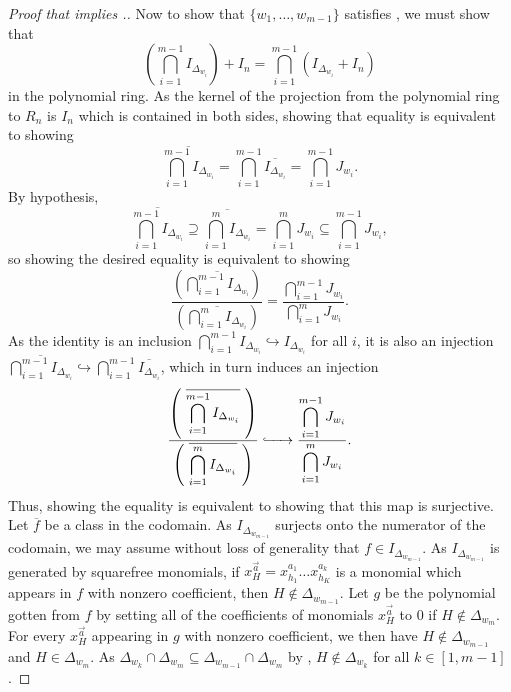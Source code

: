 \begin{proof}[Proof that  implies .]
    Now to show that $\{w_1,\dots,w_{m-1}\}$ satisfies , we must show that 
    \[
    \left(\bigcap_{i=1}^{m-1} I_{\Delta_{w_i}}\right)+I_n=\bigcap_{i=1}^{m-1} \left(I_{\Delta_{w_i}}+I_n\right)
    \]
    in the polynomial ring.
    As the kernel of the projection from the polynomial ring to $R_n$ is $I_n$ which is contained in both sides, showing that equality is equivalent to showing  
    \[
    \overline{\bigcap_{i=1}^{m-1} I_{\Delta_{w_i}}}=\bigcap_{i=1}^{m-1} \overline{I_{\Delta_{w_i}}}=\bigcap_{i=1}^{m-1}J_{w_i}.
    \]
    By hypothesis, 
    \[
    \overline{\bigcap_{i=1}^{m-1} I_{\Delta_{w_i}}}\supseteq \overline{\bigcap_{i=1}^{m} I_{\Delta_{w_i}}}=\bigcap_{i=1}^{m} J_{w_i}\subseteq \bigcap_{i=1}^{m-1} J_{w_i},
    \]
    so showing the desired equality is equivalent to showing
    \[\frac{\left(\displaystyle
\overline{\bigcap_{i=1}^{m-1}I_{\Delta_{w_i}}}\right)}
{\left(\displaystyle
\overline{\bigcap_{i=1}^{m}I_{\Delta_{w_i}}}\right)}
=
\frac{\displaystyle\bigcap_{i=1}^{m-1}J_{w_i}}
{\displaystyle\bigcap_{i=1}^{m}J_{w_i}}.\]
    As the identity is an inclusion $\bigcap_{i=1}^{m-1} I_{\Delta_{w_i}}\hookrightarrow I_{\Delta_{w_i}}$ for all $i$, it is also an injection $\overline{\bigcap_{i=1}^{m-1} I_{\Delta_{w_i}}}\hookrightarrow \bigcap_{i=1}^{m-1} \overline{I_{\Delta_{w_i}}}$, which in turn induces an injection 
    \[\frac{\left(~\displaystyle
\overline{\bigcap_{i=1}^{m-1}I_{\Delta_{w_i}}}~\right)}
{\left(~\displaystyle
\overline{\bigcap_{i=1}^{m}I_{\Delta_{w_i}}}~\right)}
\lhook\joinrel\xrightarrow{\hspace{.2in}}
\frac{\displaystyle\bigcap_{i=1}^{m-1}J_{w_i}}
{\displaystyle\bigcap_{i=1}^{m}J_{w_i}}.\]
    Thus, showing the equality is equivalent to showing that this map is surjective.
    Let $\overline{f}$ be a class in the codomain.
    As $I_{\Delta_{w_{m-1}}}$ surjects onto the numerator of the codomain, we may assume without loss of generality that $f \in I_{\Delta_{w_{m-1}}}$.
    As $I_{\Delta_{w_{m-1}}}$ is generated by squarefree monomials, if $x_H^{\vec{a}} = x_{h_1}^{a_1}\dots x_{h_K}^{a_k}$ is a monomial which appears in $f$ with nonzero coefficient, then $H\not\in \Delta_{w_{m-1}}$. 
    Let $g$ be the polynomial gotten from $f$ by setting all of the coefficients of monomials $x_H^{\vec{a}}$ to $0$ if $H \not\in \Delta_{w_m}$.
    For every $x_H^{\vec{a}}$ appearing in $g$ with nonzero coefficient, we then have $H \not\in \Delta_{w_{m-1}}$ and $H\in\Delta_{w_m}$.
    As $\Delta_{w_k}\cap \Delta_{w_m}\subseteq \Delta_{w_{m-1}}\cap \Delta_{w_m}$ by ,  $H\not\in \Delta_{w_k}$ for all $k\in [1,m-1]$.

\end{proof}
